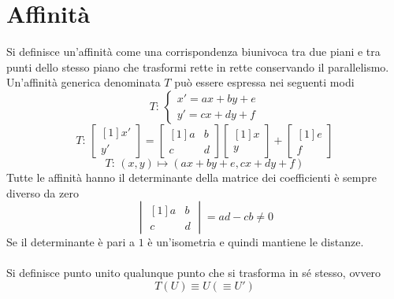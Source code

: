 
\section{Affinità}\label{sec:aff}
Si definisce un'affinità come una corrispondenza biunivoca tra due piani e tra punti dello stesso 
piano che trasformi rette in rette conservando il parallelismo.\\
Un'affinità generica denominata $T$ può essere espressa nei seguenti modi
\begin{equation*}
  T:\,\begin{cases}
    x'=ax+by+e\\
    y'=cx+dy+f
  \end{cases}
\end{equation*}
\begin{equation*}
  T:\,\begin{bmatrix}[1]
    x'\\y'
  \end{bmatrix}=
  \begin{bmatrix}[1]
    a&b\\
    c&d
  \end{bmatrix}
  \begin{bmatrix}[1]
    x\\y
  \end{bmatrix}
  +\begin{bmatrix}[1]
    e\\f
  \end{bmatrix}
\end{equation*}
\begin{equation*}
  T:\,(x,y)\mapsto(ax+by+e,cx+dy+f)
\end{equation*}
Tutte le affinità hanno il determinante della matrice dei coefficienti è sempre diverso da zero
\begin{equation*}
  \begin{vmatrix}[1]
    a&b\\
    c&d
  \end{vmatrix} = ad-cb \neq0
\end{equation*}
Se il determinante è pari a $1$ è un'isometria e quindi mantiene le distanze.\\\\

Si definisce punto unito qualunque punto che si trasforma in sé stesso, ovvero
\begin{equation*}
  T(U) \equiv U (\equiv U')
\end{equation*}

